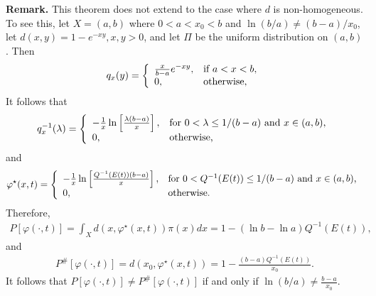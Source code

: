 \documentclass[12pt]{article}
\theoremstyle{plain}
\theoremstyle{definition}
\theoremstyle{remark}
\begin{document}
\noindent \textbf{Remark.} This theorem does not extend to the case where $d$ is non-homogeneous.  To see this, let $X=(a, b)$ where  $0<a<x_0<b$ and $\ln(b/a)\neq (b-a)/x_0$,  let $d(x, y)=1-e^{-xy}, x, y>0$,  and let $\Pi$ be the uniform distribution on $(a, b)$.
Then 
\[
q_x(y) = \left\{
		                           \begin{array}{ll}
		                         \frac{x}{b-a}e^{-xy},& \hbox{if $a<x<b$,} \\
					0,  & \hbox{otherwise,} 
		                          \end{array}
		                         \right.
\]
It follows that
\[
q_x^{-1}(\lambda) = \left\{
		                           \begin{array}{ll}
		                         -\frac{1}{x} \ln\left[\frac{\lambda (b-a)} {x}\right],& \hbox{for $0<\lambda \leq 1/(b-a)$ and $x\in (a, b)$,} \\
					0,  & \hbox{otherwise,} 
		                          \end{array}
		                         \right.
\]
and 
\[
\varphi^\star(x, t)
=\left\{
		                           \begin{array}{ll}
		                           -\frac{1}{x} \ln\left[\frac{Q^{-1}(E(t)) (b-a)} {x}\right], & \hbox{for $0<Q^{-1}(E(t)) \leq 1/(b-a)$ and $x\in (a, b)$,} \\
					0,  & \hbox{otherwise.} 
		                          \end{array}
		                         \right.
\]
Therefore, 
\begin{eqnarray*}
P[\varphi(\cdot, t)]=\int_Xd(x, \varphi^\star(x, t))\pi(x)dx=1-(\ln b-\ln a)Q^{-1}(E(t)),
\end{eqnarray*}
and
\begin{eqnarray*}
P^{\#}[\varphi(\cdot, t)]=d(x_0, \varphi^\star(x, t))=1-\frac{(b-a)Q^{-1}(E(t))}{x_0}.
\end{eqnarray*}
It follows that $P[\varphi(\cdot, t)]\neq P^{\#}[\varphi(\cdot, t)]$ if and only if $\ln (b/a)\neq \frac{b-a}{x_0}$.  

\end{document}
